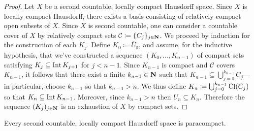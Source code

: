 \begin{proof}
    Let \(X\) be a second countable, locally compact Hausdorff space. Since \(X\) is
    locally compact Hausdorff, there exists a basis consisting of relatively compact
    open subsets of \(X\). Since \(X\) is second countable, one can consider a
    countable cover of \(X\) by relatively compact sets
    \(\mathcal{C} \coloneq \{C_j\}_{j \in \mathbf{N}}\). We proceed by induction for the
    construction of each \(K_j\). Define \(K_0 \coloneq \overline{U}_0\), and
    assume, for the inductive hypothesis, that we've constructed a sequence
    \((K_0, \dots, K_{n-1})\) of compact sets satisfying
    \(K_j \subseteq \operatorname{Int} K_{j+1}\) for \(j < n-1\). Since \(K_{n-1}\) is compact and
    \(\mathcal{C}\) covers \(K_{n-1}\), it follows that there exist a finite
    \(k_{n-1} \in \mathbf{N}\) such that
    \(K_{n-1} \subseteq \bigcup_{j=0}^{k_{n-1}} C_j\)---in particular, choose
    \(k_{n-1}\) so that \(k_{n-1} > n\). We thus define
    \(K_n \coloneq \bigcup_{j=0}^{k_{n-1}} \operatorname{Cl}(C_j)\) so that
    \(K_n \subseteq \operatorname{Int} K_{n-1}\). Moreover, since \(k_{n-1} > n\) then
    \(U_n \subseteq K_n\). Therefore the sequence \((K_j)_{j \in \mathbf{N}}\) is an
    exhaustion of \(X\) by compact sets.
\end{proof}

\begin{theorem}
    \label{thm:2nd-ctbl-loc-cpct-haus-is-paracompact}
    Every second countable, locally compact Hausdorff space is paracompact.
\end{theorem}

